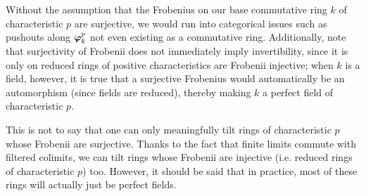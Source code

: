                     \begin{remark} \label{remark: surjective_frobenii}
                        Without the assumption that the Frobenius on our base commutative ring $k$ of characteristic $p$ are surjective, we would run into categorical issues such as pushouts along $\bm{\varphi}^p_k$ not even existing as a commutative ring. Additionally, note that surjectivity of Frobenii does not immediately imply invertibility, since it is only on reduced rings of positive characteristics are Frobenii injective; when $k$ is a field, however, it is true that a surjective Frobenius would automatically be an automorphism (since fields are reduced), thereby making $k$ a perfect field of characteristic $p$. 
                        
                        This is not to say that one can only meaningfully tilt rings of characteristic $p$ whose Frobenii are surjective. Thanks to the fact that finite limits commute with filtered colimits, we can tilt rings whose Frobenii are injective (i.e. reduced rings of characteristic $p$) too. However, it should be said that in practice, most of these rings will actually just be perfect fields. 
                    \end{remark}
                    
